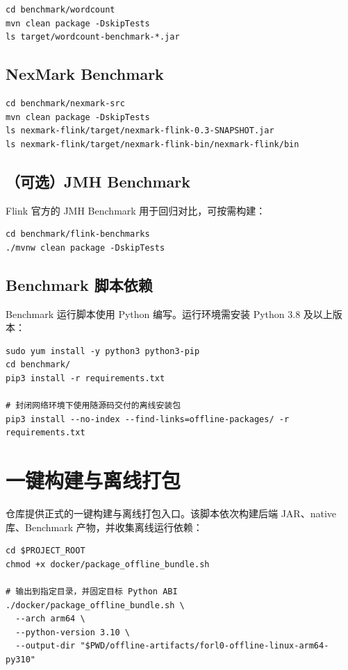 \documentclass[a4paper,11pt]{article}
\begin{document}
\begin{lstlisting}[language=shellcmd]
cd benchmark/wordcount
mvn clean package -DskipTests
ls target/wordcount-benchmark-*.jar
\end{lstlisting}

\subsection{NexMark Benchmark}

\begin{lstlisting}[language=shellcmd]
cd benchmark/nexmark-src
mvn clean package -DskipTests
ls nexmark-flink/target/nexmark-flink-0.3-SNAPSHOT.jar
ls nexmark-flink/target/nexmark-flink-bin/nexmark-flink/bin
\end{lstlisting}

\subsection{（可选）JMH Benchmark}

Flink 官方的 JMH Benchmark 用于回归对比，可按需构建：

\begin{lstlisting}[language=shellcmd]
cd benchmark/flink-benchmarks
./mvnw clean package -DskipTests
\end{lstlisting}

\subsection{Benchmark 脚本依赖}

Benchmark 运行脚本使用 Python 编写。运行环境需安装 Python 3.8 及以上版本：

\begin{lstlisting}[language=shellcmd]
sudo yum install -y python3 python3-pip
cd benchmark/
pip3 install -r requirements.txt

# 封闭网络环境下使用随源码交付的离线安装包
pip3 install --no-index --find-links=offline-packages/ -r requirements.txt
\end{lstlisting}

\section{一键构建与离线打包}

仓库提供正式的一键构建与离线打包入口。该脚本依次构建后端 JAR、native 库、Benchmark 产物，并收集离线运行依赖：

\begin{lstlisting}[language=shellcmd]
cd $PROJECT_ROOT
chmod +x docker/package_offline_bundle.sh

# 输出到指定目录，并固定目标 Python ABI
./docker/package_offline_bundle.sh \
  --arch arm64 \
  --python-version 3.10 \
  --output-dir "$PWD/offline-artifacts/forl0-offline-linux-arm64-py310"
\end{lstlisting}
\end{document}
